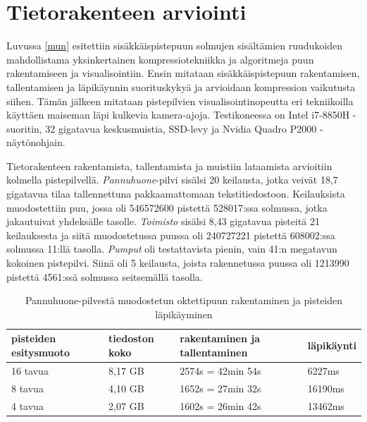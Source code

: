 \section{Tietorakenteen arviointi}\label{tulokset}

Luvussa \ref{mun} esitettiin sisäkkäispistepuun solmujen sisältämien ruudukoiden mahdollistama yksinkertainen kompressiotekniikka ja algoritmeja puun rakentamiseen ja visualisointiin. Ensin mitataan sisäkkäispistepuun rakentamisen, tallentamisen ja läpikäynnin suorituskykyä ja arvioidaan kompression vaikutusta siihen. Tämän jälkeen mitataan pistepilvien visualisointinopeutta eri tekniikoilla käyttäen maiseman läpi kulkevia kamera-ajoja. Testikoneessa on Intel i7-8850H -suoritin, 32 gigatavua keskusmuistia, SSD-levy ja Nvidia Quadro P2000 -näytönohjain.  

Tietorakenteen rakentamista, tallentamista ja muistiin lataamista arvioitiin kolmella pistepilvellä. \emph{Pannuhuone}-pilvi sisälsi 20 keilausta, jotka veivät 18,7 gigatavua tilaa tallennettuna pakkaamattomaan tekstitiedostoon. Keilauksista muodostettiin puu, jossa oli 546572600 pistettä 528017:ssa solmussa, jotka jakautuivat yhdeksälle tasolle. \emph{Toimisto} sisälsi 8,43 gigatavua pisteitä 21 keilauksesta ja siitä muodostetussa puussa oli 240727221 pistettä 608002:ssa solmussa 11:llä tasolla. \emph{Pumput} oli testattavista pienin, vain 41:n megatavun kokoinen pistepilvi. Siinä oli 5 keilausta, joista rakennetussa puussa oli 1213990 pistettä 4561:ssä solmussa seitsemällä tasolla.  

\begin{table}[h]
    \begin{tabular}{|l|l|l|l|}
    \hline
    \textbf{pisteiden esitysmuoto} & \textbf{tiedoston koko} & \textbf{rakentaminen ja tallentaminen} & \textbf{läpikäynti} \\ \hline
    16 tavua       & 8,17 GB             & 2574s = 42min 54s              & 6227ms     \\
    8 tavua        & 4,10 GB             & 1652s = 27min 32s             & 16190ms    \\
    4 tavua        & 2,07 GB             & 1602s = 26min 42s             & 13462ms    \\ \hline
    \end{tabular}
    \caption{Pannuhuone-pilvestä muodostetun oktettipuun rakentaminen ja pisteiden läpikäyminen}
    \label{taulukko:pannuhuone}
\end{table}


